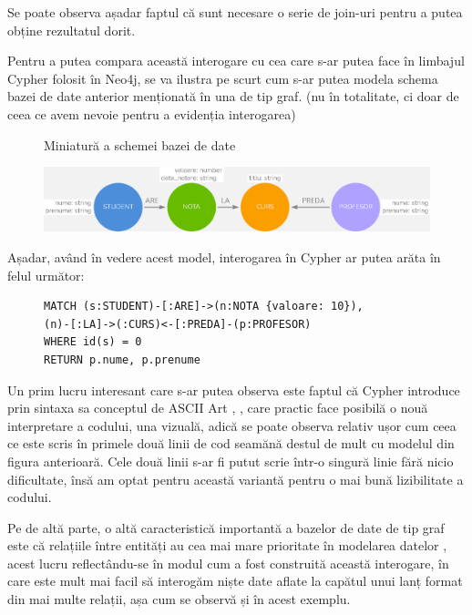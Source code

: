 \documentclass[12pt,a4paper]{report}
\begin{document}
Se poate observa așadar faptul că sunt necesare o serie de join-uri pentru a putea obține rezultatul dorit.


Pentru a putea compara această interogare cu cea care s-ar putea face în limbajul Cypher folosit în Neo4j, se va ilustra pe scurt cum s-ar putea modela schema bazei de date anterior menționată în una de tip graf. (nu în totalitate, ci doar de ceea ce avem nevoie pentru a evidenția interogarea)


\begin{figure}[H]
\centering
\caption{Miniatură a schemei bazei de date}
\includegraphics[scale=0.4]{exemplu_3_neo4j}
\caption*{}
\end{figure}


Așadar, având în vedere acest model, interogarea în Cypher ar putea arăta în felul următor:

\begin{figure}[H]
\centering
\begin{BVerbatim}
MATCH (s:STUDENT)-[:ARE]->(n:NOTA {valoare: 10}),
(n)-[:LA]->(:CURS)<-[:PREDA]-(p:PROFESOR)
WHERE id(s) = 0
RETURN p.nume, p.prenume
\end{BVerbatim}
\end{figure}



Un prim lucru interesant care s-ar putea observa este faptul că Cypher introduce prin sintaxa sa conceptul de ASCII Art \cite{8}, \cite{9}, care practic face posibilă o nouă interpretare a codului, una vizuală, adică se poate observa relativ ușor cum ceea ce este scris în primele două linii de cod seamănă destul de mult cu modelul din figura anterioară.
Cele două linii s-ar fi putut scrie într-o singură linie fără nicio dificultate, însă am optat pentru această variantă pentru o mai bună lizibilitate a codului.

Pe de altă parte, o altă caracteristică importantă a bazelor de date de tip graf este că relațiile între entități au cea mai mare prioritate în modelarea datelor \cite{10}, acest lucru reflectându-se în modul cum a fost construită această interogare, în care este mult mai facil să interogăm niște date aflate la capătul unui lanț format din mai multe relații, așa cum se observă și în acest exemplu.
\end{document}
